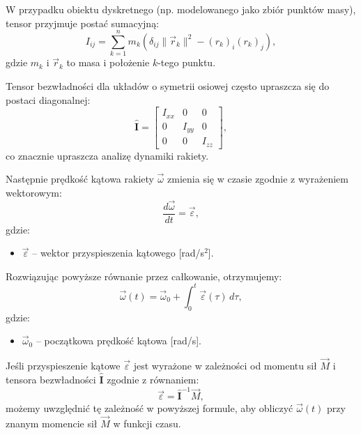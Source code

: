 W przypadku obiektu dyskretnego (np. modelowanego jako zbiór punktów masy), tensor przyjmuje postać sumacyjną:
\begin{equation}
I_{ij} = \sum_{k=1}^n m_k \left( \delta_{ij} \|\vec{r}_k\|^2 - (r_k)_i (r_k)_j \right),
\label{eq:inertia_tensor_sum}
\end{equation}
gdzie $m_k$ i $\vec{r}_k$ to masa i położenie $k$-tego punktu.

Tensor bezwładności dla układów o symetrii osiowej często upraszcza się do postaci diagonalnej:
\begin{equation}
\mathbf{\hat{I}} =
\begin{bmatrix}
I_{xx} & 0 & 0 \\
0 & I_{yy} & 0 \\
0 & 0 & I_{zz}
\end{bmatrix},
\end{equation}
co znacznie upraszcza analizę dynamiki rakiety.


Następnie prędkość kątowa rakiety $\vec{\omega}$ zmienia się w czasie zgodnie z wyrażeniem wektorowym:
\begin{equation}
\frac{d\vec{\omega}}{dt} = \vec{\varepsilon},
\label{eq:angular_velocity_vector}
\end{equation}
gdzie:
\begin{itemize}
\item $\vec{\varepsilon}$ -- wektor przyspieszenia kątowego [rad/s$^2$].
\end{itemize}

Rozwiązując powyższe równanie przez całkowanie, otrzymujemy:
\begin{equation}
\vec{\omega}(t) = \vec{\omega}_0 + \int_0^t \vec{\varepsilon}(\tau) \, d\tau,
\label{eq:angular_velocity_integral}
\end{equation}
gdzie:
\begin{itemize}
\item $\vec{\omega}_0$ -- początkowa prędkość kątowa [rad/s].
\end{itemize}

Jeśli przyspieszenie kątowe $\vec{\varepsilon}$ jest wyrażone w zależności od momentu sił $\vec{M}$ i tensora bezwładności $\mathbf{\hat{I}}$ zgodnie z równaniem:
\begin{equation}
\vec{\varepsilon} = \mathbf{\hat{I}}^{-1} \vec{M},
\end{equation}
możemy uwzględnić tę zależność w powyższej formule, aby obliczyć $\vec{\omega}(t)$ przy znanym momencie sił $\vec{M}$ w funkcji czasu.

